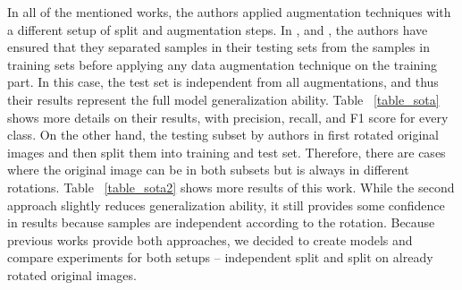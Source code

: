 \documentclass[fleqn,usenatbib]{mnras}
\begin{document}
In all of the mentioned works, the authors applied augmentation techniques with a different setup of split and augmentation steps. In \cite{3,1}, and \cite{Lukic_2018}, the authors have ensured that they separated samples in their testing sets from the samples in training sets before applying any data augmentation technique on the training part. In this case, the test set is independent from all augmentations, and thus their results represent the full model generalization ability. Table~ \ref{table_sota} shows more details on their results, with precision, recall, and F1 score for every class. On the other hand, the testing subset by authors in \cite{2} first rotated original images and then split them into training and test set. Therefore, there are cases where the original image can be in both subsets but is always in different rotations.  Table~ \ref{table_sota2} shows more results of this work. While the second approach slightly reduces generalization ability, it still provides some confidence in results because samples are independent according to the rotation. Because previous works provide both approaches, we decided to create models and compare experiments for both setups – independent split and split on already rotated original images.
\end{document}

